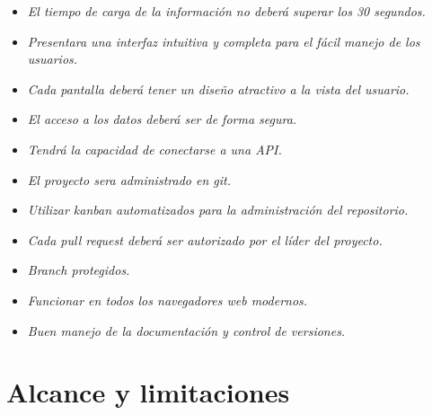 \documentclass[12pt,a4paper]{book}
\begin{document}
\begin{itemize}
\item \textit{El tiempo de carga de la información no deberá superar los 30 segundos.}
\item \textit{Presentara una interfaz intuitiva y completa para el fácil manejo de los usuarios.}
\item \textit{Cada pantalla deberá tener un diseño atractivo a la vista del usuario.}
\item \textit{El acceso a los datos deberá ser de forma segura.}
\item \textit{Tendrá la capacidad de conectarse a una API.}
\item \textit{El proyecto sera administrado en git.}
\item \textit{Utilizar kanban automatizados para la administración del repositorio.}
\item \textit{Cada pull request deberá ser autorizado por el líder del proyecto.}
\item \textit{Branch protegidos.}
\item \textit{Funcionar en todos los navegadores web modernos.}
\item \textit{Buen manejo de la documentación y control de versiones.}
\end{itemize}

\chapter{Alcance y limitaciones}
\end{document}
